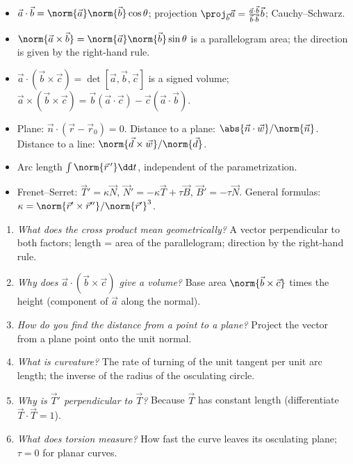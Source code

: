 \begin{summarybox}
\begin{itemize}
  \item $\vec a\cdot\vec b=\norm{\vec a}\norm{\vec b}\cos\theta$; projection $\proj_{\vec b}\vec a=\frac{\vec a\cdot\vec b}{\vec b\cdot\vec b}\vec b$; Cauchy--Schwarz.
  \item $\norm{\vec a\times\vec b}=\norm{\vec a}\norm{\vec b}\sin\theta$ is a parallelogram area; the direction is given by the right-hand rule.
  \item $\vec a\cdot(\vec b\times\vec c)=\det[\vec a,\vec b,\vec c]$ is a signed volume; $\vec a\times(\vec b\times\vec c)=\vec b(\vec a\cdot\vec c)-\vec c(\vec a\cdot\vec b)$.
  \item Plane: $\vec n\cdot(\vec r-\vec r_0)=0$. Distance to a plane: $\abs{\vec n\cdot\vec w}/\norm{\vec n}$. Distance to a line: $\norm{\vec d\times\vec w}/\norm{\vec d}$.
  \item Arc length $\int\norm{\vec r\,'}\dd t$, independent of the parametrization.
  \item Frenet--Serret: $\vec T'=\kappa\vec N$, $\vec N'=-\kappa\vec T+\tau\vec B$, $\vec B'=-\tau\vec N$. General formulas: $\kappa=\norm{\vec r'\times\vec r''}/\norm{\vec r'}^3$.
\end{itemize}
\end{summarybox}

\begin{interview}
\begin{enumerate}
  \item \emph{What does the cross product mean geometrically?} A vector perpendicular to both factors; length = area of the parallelogram; direction by the right-hand rule.
  \item \emph{Why does $\vec a\cdot(\vec b\times\vec c)$ give a volume?} Base area $\norm{\vec b\times\vec c}$ times the height (component of $\vec a$ along the normal).
  \item \emph{How do you find the distance from a point to a plane?} Project the vector from a plane point onto the unit normal.
  \item \emph{What is curvature?} The rate of turning of the unit tangent per unit arc length; the inverse of the radius of the osculating circle.
  \item \emph{Why is $\vec T'$ perpendicular to $\vec T$?} Because $\vec T$ has constant length (differentiate $\vec T\cdot\vec T=1$).
  \item \emph{What does torsion measure?} How fast the curve leaves its osculating plane; $\tau=0$ for planar curves.
\end{enumerate}
\end{interview}


